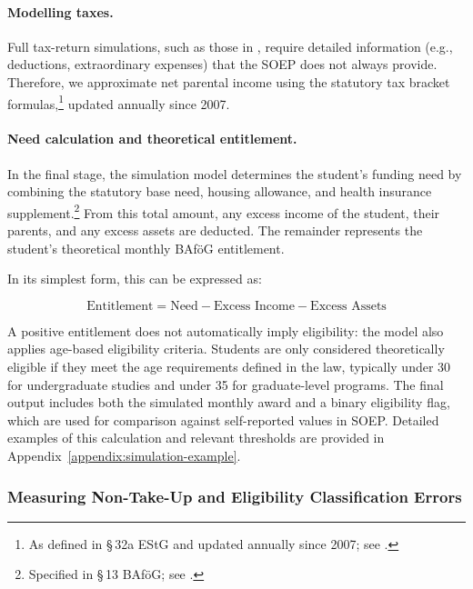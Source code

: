 \paragraph{Modelling taxes.}
Full tax-return simulations, such as those in \cite{herber_non-take-up_2019}, require detailed information (e.g., deductions, extraordinary expenses) that the SOEP does not always provide.  
Therefore, we approximate net parental income using the statutory tax bracket formulas,\footnote{As defined in §\,32a EStG and updated annually since 2007; see \citet{estg_law,estg_2025,estg_2024,estg_2023,estg_2022,estg_2021,estg_2020,estg_2019,estg_2018,estg_2017,estg_2016,estg_2015,estg_2014,estg_2013,estg_2012,estg_2007,estg_2006}.} updated annually since 2007.

\paragraph{Need calculation and theoretical entitlement.}
In the final stage, the simulation model determines the student's funding need by combining the statutory base need, housing allowance, and health insurance supplement.\footnote{Specified in §\,13 BAföG; see \citet{bafoeg_law}.} 
From this total amount, any excess income of the student, their parents, and any excess assets are deducted. The remainder represents the student's theoretical monthly BAföG entitlement.

In its simplest form, this can be expressed as:

\begin{equation}
    \text{Entitlement} = \text{Need} - \text{Excess Income} - \text{Excess Assets}
\end{equation}

A positive entitlement does not automatically imply eligibility: the model also applies age-based eligibility criteria. 
Students are only considered theoretically eligible if they meet the age requirements defined in the law, typically under 30 for undergraduate studies and under 35 for graduate-level programs. 
The final output includes both the simulated monthly award and a binary eligibility flag, which are used for comparison against self-reported values in SOEP. 
Detailed examples of this calculation and relevant thresholds are provided in Appendix~\ref{appendix:simulation-example}.

\subsubsection{Measuring Non-Take-Up and Eligibility Classification Errors}

